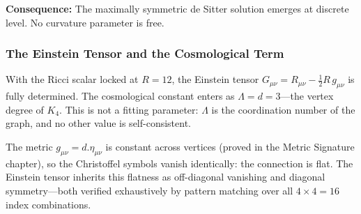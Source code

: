 \documentclass[11pt,a4paper]{book}
\def\cdot{.}%
\begin{document}
\textbf{Consequence:} The maximally symmetric de Sitter solution emerges at discrete level. No curvature parameter is free.


\subsubsection*{The Einstein Tensor and the Cosmological Term}

With the Ricci scalar locked at $R = 12$, the Einstein tensor
$G_{\mu\nu} = R_{\mu\nu} - R\,g_{\mu\nu}$ is fully
determined. The cosmological constant enters as $\Lambda = d = 3$---the
vertex degree of $K_4$. This is not a fitting parameter: $\Lambda$ is
the coordination number of the graph, and no other value is
self-consistent.

The metric $g_{\mu\nu} = d \cdot \eta_{\mu\nu}$ is constant across
vertices (proved in the Metric Signature chapter), so the Christoffel
symbols vanish identically: the connection is flat. The Einstein
tensor inherits this flatness as off-diagonal vanishing and diagonal
symmetry---both verified exhaustively by pattern matching over all
$4  = 16$ index combinations.
\end{document}
